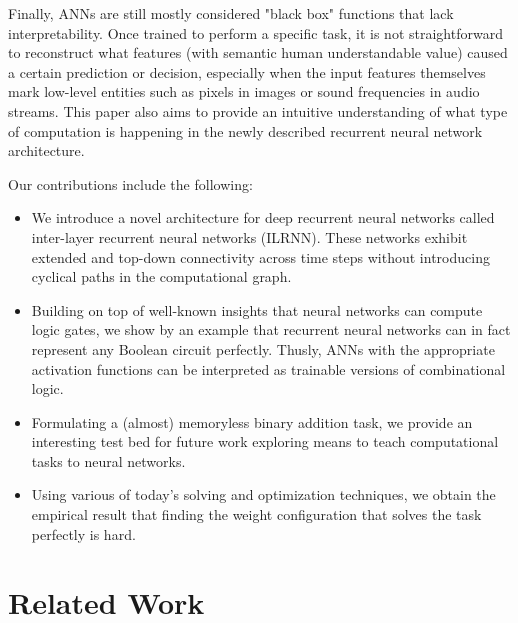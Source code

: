 \documentclass{article}
\begin{document}
Finally, ANNs are still mostly considered "black box" functions that lack interpretability.
Once trained to perform a specific task, it is not straightforward to reconstruct what features (with semantic human understandable value) caused a certain prediction or decision, especially when the input features themselves mark low-level entities such as pixels in images or sound frequencies in audio streams. This paper also aims to provide an intuitive understanding of what type of computation is happening in the newly described recurrent neural network architecture.


Our contributions include the following:
\begin{itemize}
    \item We introduce a novel architecture for deep recurrent neural networks   called inter-layer recurrent neural networks (ILRNN). These networks exhibit extended and top-down connectivity across time steps without introducing cyclical paths in the computational graph. 
    \item Building on top of well-known insights that neural networks can compute logic gates, we show by an example that recurrent neural networks can in fact represent any Boolean circuit perfectly. Thusly, ANNs with the appropriate activation functions can be interpreted as trainable versions of combinational logic.
    \item Formulating a (almost) memoryless binary addition task, we provide an interesting test bed for future work exploring means to teach computational tasks to neural networks.
    \item Using various of today's solving and optimization techniques, we obtain the empirical result that finding the weight configuration that solves the task perfectly is hard.
\end{itemize}

\section{Related Work}
\label{related-work}
\end{document}
